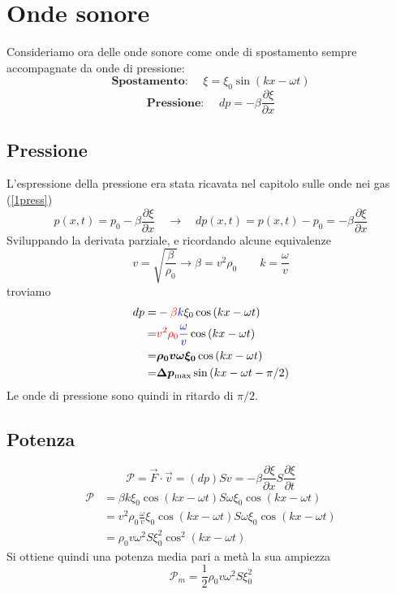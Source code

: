 \documentclass[x11names]{report}
\begin{document}
	\section{Onde sonore}\label{Onde Sonore}
	Consideriamo ora delle onde sonore come onde di spostamento sempre accompagnate da onde di pressione:
	\[ 
	\textbf{Spostamento: }\quad \xi = \xi _0\sin(kx-\omega t)
	\]
	\[ 
	\textbf{Pressione: }\quad dp = -\beta \frac{\partial\xi}{\partial x}
	\]
	\subsection{Pressione}
	L'espressione della pressione era stata ricavata nel capitolo sulle onde nei gas (\ref{1press})
	\[ 
	p(x,t) = p_0 -\beta \frac{\partial \xi }{\partial x} \quad \to \quad dp(x,t) = p(x,t) - p_0 = -\beta \frac{\partial \xi }{\partial x}
	\]
	Sviluppando la derivata parziale, e ricordando alcune equivalenze
	\[ 
	\boxed{v = \sqrt{\frac{\beta}{\rho_0}} \to  \beta = v^2\rho_0} \qquad \boxed{k = \frac{\omega }{v}}
	\]
	troviamo
	\begin{align*}
		dp =& -\textcolor{red}{\beta} \textcolor{blue}{k} \xi_0 \cos\left(kx-\omega t\right) \\
		=& \textcolor{red}{v^2 \rho_0}\textcolor{blue}{\frac{\omega }{v}} \cos\left(kx-\omega t\right) \\
		=& \boldsymbol{\rho_0 v \omega  \xi_0}  \cos\left(kx-\omega t\right) \\ 
		=& \boldsymbol{\Delta p_{\text{max}}} \sin\left(kx -\omega t - \pi /2\right) \\
	\end{align*}
	Le onde di pressione sono quindi in ritardo di \(\pi /2\).
	
	\subsection{Potenza}
	\[ 
	\mathcal{P} = \overrightarrow{F}\cdot \vec{v} = (dp)S v = -\beta \frac{\partial\xi}{\partial x} S \frac{\partial\xi}{\partial t}
	\]
	\begin{align*}
		\mathcal{P} &= \beta k \xi_0 \cos\left(kx- \omega t\right) S \omega  \xi_0 \cos\left(kx- \omega t\right)\\
		&= v^2\rho_0 \frac{\omega}{v} \xi_0 \cos\left(kx- \omega t\right) S \omega \xi_0 \cos\left(kx- \omega t\right)\\
		&=  \rho_0 v \omega ^2 S \xi_0^2 \cos^2\left(kx- \omega t\right) 
	\end{align*}
	Si ottiene quindi una potenza media pari a metà la sua ampiezza
	\[ 
	\mathcal{P}_m = \frac{1}{2} \rho_0 v \omega ^2 S \xi_0^2
	\]
\end{document}
